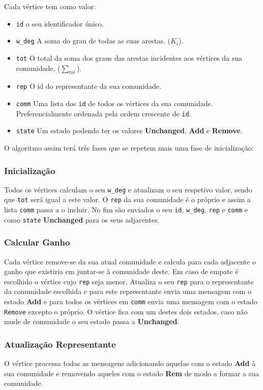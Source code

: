 \documentclass[a4paper,10pt]{report}
\begin{document}
Cada vértice tem como valor:
\begin{itemize}
	\item \verb|id| o seu identificador único.
	\item \verb|w_deg| A soma do grau de todas as suas arestas. ($K_i$).
	\item \verb|tot| O total da soma dos graus das arestas incidentes aos vértices da sua comunidade. ($\sum_{tot}$).
	\item \verb|rep| O id do representante da sua comunidade.
	\item \verb|comm| Uma lista dos \verb|id| de todos os vértices da sua comunidade. Preferencialmente ordenada pela ordem crescente de \verb|id|.
	\item \verb|state| Um estado podendo ter os valores \textbf{Unchanged}, \textbf{Add} e \textbf{Remove}.
\end{itemize}



O algoritmo assim terá três fases que se repetem mais uma fase de inicialização:

\subsubsection*{Inicialização}
Todos os vértices calculam o seu \verb|w_deg| e atualizam o seu respetivo valor, sendo que \verb|tot| será igual a este valor. O \verb|rep| da sua comunidade é o próprio e assim a lista \verb|comm| passa a o incluir. No fim são enviados o seu \verb|id|, \verb|w_deg|, \verb|rep| e \verb|comm| e como \verb|state| \textbf{Unchanged} para os seus adjacentes.


\subsubsection*{Calcular Ganho}
Cada vértice remove-se da sua atual comunidade e calcula para cada adjacente o ganho que existiria em juntar-se à comunidade deste. Em caso de empate é escolhido o vértice cujo \verb|rep| seja menor. Atualiza o seu \verb|rep| para o representante da comunidade escolhida e para este representante envia uma mensagem com o estado \textbf{Add} e para todos os vértices em \verb|comm| envia uma mensagem com o estado \verb|Remove| excepto o próprio. O vértice fica com um destes dois estados, caso não mude de comunidade o seu estado passa a \textbf{Unchanged}.

\subsubsection{Atualização Representante}
O vértice processa todas as mensagens adicionando aquelas com o estado \textbf{Add} à sua comunidade e removendo aqueles com o estado \textbf{Rem} de modo a formar a sua comunidade.
\end{document}
